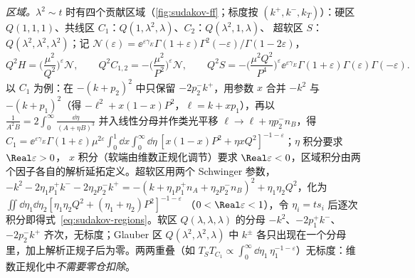 \begin{example}
\emph{区域。}$\lambda^2\sim t$ 时有四个贡献区域（\cref{fig:sudakov-ff}；标度按 $(k^+,k^-,k_T)$）：硬区 $Q(1,1,1)$、共线区 $C_1$：$Q(1,\lambda^2,\lambda)$、$C_2$：$Q(\lambda^2,1,\lambda)$、
超软区 $S$：$Q(\lambda^2,\lambda^2,\lambda^2)$；记 $\mathcal N(\varepsilon)=\ee^{\varepsilon\gamma_E}\Gamma(1+\varepsilon)\Gamma^2(-\varepsilon)/\Gamma(1-2\varepsilon)$，
\begin{equation}\label{eq:sudakov-regions}
Q^2H=\Big(\frac{\mu^2}{Q^2}\Big)^{\varepsilon}\mathcal N,\qquad Q^2C_{1,2}=-\Big(\frac{\mu^2}{P^2}\Big)^{\varepsilon}\mathcal N,\qquad
Q^2S=-\Big(\frac{\mu^2Q^2}{P^4}\Big)^{\varepsilon}\ee^{\varepsilon\gamma_E}\Gamma(1+\varepsilon)\Gamma(\varepsilon)\Gamma(-\varepsilon).
\end{equation}
以 $C_1$ 为例：在 $-(k+p_2)^2$ 中只保留 $-2p_2^-k^+$，用参数 $x$ 合并 $-k^2$ 与 $-(k+p_1)^2$（得 $-\ell^2+x(1-x)P^2$，$\ell=k+xp_1$），再以 $\frac{1}{A^2B}=2\int_0^\infty\frac{\dd\eta}{(A+\eta B)^3}$
并入线性分母并作类光平移 $\ell\to\ell+\eta p_2^-n_B$，得
$C_1=\ee^{\varepsilon\gamma_E}\Gamma(1+\varepsilon)\mu^{2\varepsilon}\int_0^1\!\dd x\int_0^\infty\!\dd\eta\,[x(1-x)P^2+\eta xQ^2]^{-1-\varepsilon}$；$\eta$ 积分要求 $\Real\varepsilon>0$，
$x$ 积分（软端由维数正规化调节）要求 $\Real\varepsilon<0$，区域积分由两个因子各自的解析延拓定义。超软区用两个 Schwinger 参数，
$-k^2-2\eta_1p_1^+k^--2\eta_2p_2^-k^+=-(k+\eta_1p_1^+n_A+\eta_2p_2^-n_B)^2+\eta_1\eta_2Q^2$，化为 $\iint\dd\eta_1\dd\eta_2[\eta_1\eta_2Q^2+(\eta_1+\eta_2)P^2]^{-1-\varepsilon}$
（$0<\Real\varepsilon<1$），令 $\eta_i=ts_i$ 后逐次积分即得式~\eqref{eq:sudakov-regions}。软区 $Q(\lambda,\lambda,\lambda)$ 的分母 $-k^2$、$-2p_1^+k^-$、$-2p_2^-k^+$ 齐次，无标度；Glauber 区 $Q(\lambda^2,\lambda^2,\lambda)$ 中
$k^\pm$ 各只出现在一个分母里，加上解析正规子后为零。两两重叠（如 $T_ST_{C_1}\propto\int_0^\infty\dd\eta_1\,\eta_1^{-1-\varepsilon}$）无标度：维数正规化中\emph{不需要零仓扣除}。


\end{example}
